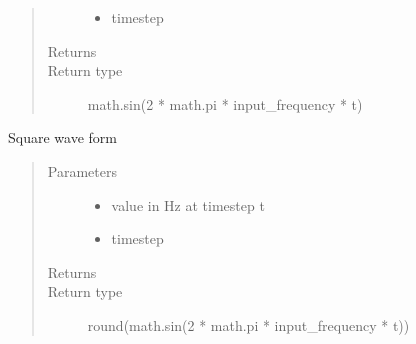\documentclass[letterpaper,10pt,english,openany,oneside]{sphinxmanual}
\begin{document}
\begin{fulllineitems}
\begin{fulllineitems}
\begin{quote}
\begin{description}
\begin{itemize}
\item {} 
\sphinxAtStartPar
{} \textendash{} timestep

\end{itemize}

\item[{Returns}] \leavevmode
\sphinxAtStartPar


\item[{Return type}] \leavevmode
\sphinxAtStartPar
math.sin(2 * math.pi * input\_frequency * t)

\end{description}\end{quote}

\end{fulllineitems}


\begin{fulllineitems}
\label{\detokenize{dpav:dpav.audio.wave_table.square}}
\sphinxAtStartPar
Square wave form
\begin{quote}\begin{description}
\item[{Parameters}] \leavevmode\begin{itemize}
\item {} 
\sphinxAtStartPar
{} \textendash{} value in Hz at timestep t

\item {} 
\sphinxAtStartPar
{} \textendash{} timestep

\end{itemize}

\item[{Returns}] \leavevmode
\sphinxAtStartPar


\item[{Return type}] \leavevmode
\sphinxAtStartPar
round(math.sin(2 * math.pi * input\_frequency * t))

\end{description}\end{quote}

\end{fulllineitems}



\end{fulllineitems}
\end{document}
